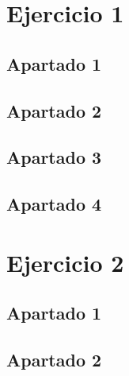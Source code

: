 \chapter{Ejercicio 1}

\section{Apartado 1}

\section{Apartado 2}

\section{Apartado 3}

\section{Apartado 4}

\chapter{Ejercicio 2}

\section{Apartado 1}

\section{Apartado 2}
